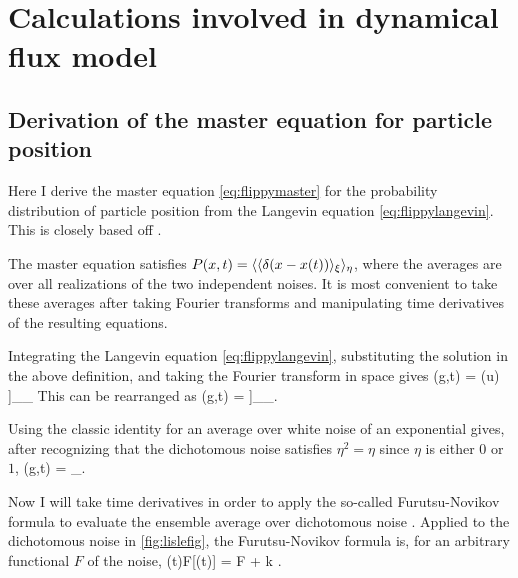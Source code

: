 
\chapter{Calculations involved in \DIFaddbegin {}\DIFaddend dynamical \DIFdelbegin {}\DIFdelend \DIFaddbegin {}\DIFaddend flux model}
\DIFdelbegin %
\DIFdelend \DIFaddbegin \label{sec:appendixAfluc}
\DIFaddend \section{Derivation of the master equation for particle position}
\label{sec:appAmaster}
Here I derive the master equation \ref{eq:flippymaster} for the probability distribution of particle position from the Langevin equation \ref{eq:flippylangevin}. This is closely based off \DIFdelbegin {}\DIFdelend \DIFaddbegin {}\DIFaddend \citet{Balakrishnan1993}.

The master equation satisfies $P(x,t) = \langle\langle \delta(x-x(t))\rangle_\xi \rangle_\eta$, where the averages are over all realizations of the two independent noises. It is most convenient to take these averages after taking Fourier transforms and manipulating time derivatives of the resulting equations.

Integrating the Langevin equation \ref{eq:flippylangevin}, substituting the solution in the above definition, and taking the Fourier transform in space gives
\be {}(g,t) = \Big\bra  \Big\bra \exp \Big[- i g \int_0^t du [V+\sqrt{2D}\xi(u)]\eta(u) \Big]\Big\ket_\eta \Big\ket_\xi\ee
This can be rearranged as
\be {}(g,t) = \Big\bra \exp{} \Big\bra \exp{}\Big]\Big\ket_\xi \Big\ket_\eta .\ee

Using the classic identity for an average over white noise of an exponential \citep{Balakrishnan1993,VanKampen2007} gives, after recognizing that the dichotomous noise satisfies $\eta^2 = \eta$ since $\eta$ is either $0$ or $1$,
\be {}(g,t) = \Big\bra \exp{}\Big\ket_\eta. \label{eq:logi}\ee

Now I will take time derivatives in order to apply the so-called Furutsu-Novikov formula to evaluate the ensemble average over dichotomous noise \citep{Shapiro1978}. Applied to the dichotomous noise in \DIFdelbegin {}\DIFdelend \DIFaddbegin {}\DIFaddend \ref{fig:lislefig}, the Furutsu-Novikov formula is, for an arbitrary functional $F$ of the noise,
\be \pt \bra \eta(t)F[\eta(t)] \ket = \bra \eta \pt F \ket + k   \label{eq:furuti}.\ee


